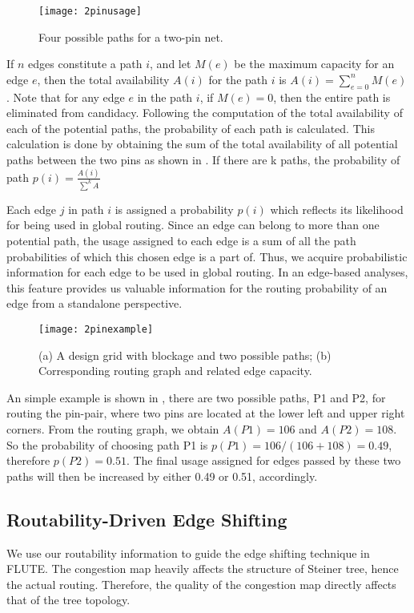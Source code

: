\begin{itemize}
\begin{figure}[tbh!]
    \centering
    \texttt{[image: 2pinusage]}
    \caption{Four possible paths for a two-pin net.}
    \label{fig:2pinusage}
\end{figure}

If $n$ edges constitute a path $i$, and let $M(e)$ be the maximum capacity for an edge $e$, then the total availability $A(i)$ for the path $i$ is $A(i)=\sum_{e=0}^{n}M(e)$. Note that for any edge $e$ in the path $i$, if $M(e)=0$, then the entire path is eliminated from candidacy. Following the computation of the total availability of each of the potential paths, the probability of each path is calculated. This calculation is done by obtaining the sum of the total availability of all potential paths between the two pins as shown in .
If there are k paths, the probability of path $p(i)=\frac{A(i)}{\sum^{k}A}$

Each edge $j$ in path $i$ is assigned a probability $p(i)$ which reflects its likelihood for being used in global routing. Since an edge can belong to more than one potential path, the usage assigned to each edge is a sum of all the path probabilities of which this chosen edge is a part of. Thus, we acquire probabilistic information for each edge to be used in global routing. In an edge-based analyses, this feature provides us valuable information for the routing probability of an edge from a standalone perspective.

\begin{figure}[tb!]
    \centerline{\texttt{[image: 2pinexample]}}
    \caption{(a) A design grid with blockage and two possible paths; (b) Corresponding routing graph and related edge capacity.}
    \label{fig:2pinexample}
\end{figure}
An simple example is shown in , there are two possible paths, P1 and P2, for routing the pin-pair, where two pins are located at the lower left and upper right corners. From the routing graph, we obtain $A(P1)=106$ and $A(P2)=108$. So the probability of choosing path P1 is $p(P1)=106/(106+108)=0.49$, therefore $p(P2)=0.51$. The final usage assigned for edges passed by these two paths will then be increased by either 0.49 or 0.51, accordingly.
\end{itemize}

\subsection{Routability-Driven Edge Shifting}
We use our routability information to guide the edge shifting technique in FLUTE\cite{fastroute}. The congestion map heavily affects the structure of Steiner tree, hence the actual routing. Therefore, the quality of the congestion map directly affects that of the tree topology.

